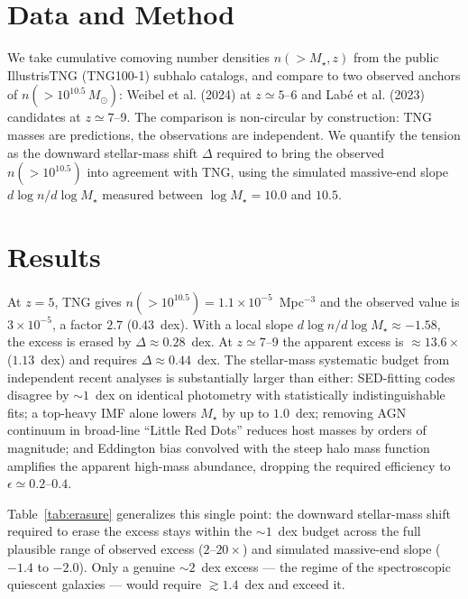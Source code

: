\documentclass[twocolumn]{aastex631}
\begin{document}
\section{Data and Method}
We take cumulative comoving number densities $n(>M_\star,z)$ from the public IllustrisTNG (TNG100-1)
subhalo catalogs, and compare to two observed anchors of $n(>10^{10.5}\,M_\odot)$: Weibel et al. (2024)
at $z\simeq5$--6 and Lab{\'e} et al. (2023) candidates at $z\simeq7$--9. The comparison is non-circular
by construction: TNG masses are predictions, the observations are independent. We quantify the tension as
the downward stellar-mass shift $\Delta$ required to bring the observed $n(>10^{10.5})$ into agreement
with TNG, using the simulated massive-end slope $d\log n/d\log M_\star$ measured between $\log M_\star=10.0$
and $10.5$.

\section{Results}
At $z=5$, TNG gives $n(>10^{10.5})=1.1\times10^{-5}$~Mpc$^{-3}$ and the observed value is
$3\times10^{-5}$, a factor $2.7$ ($0.43$~dex). With a local slope $d\log n/d\log M_\star\approx-1.58$,
the excess is erased by $\Delta\approx0.28$~dex. At $z\simeq7$--9 the apparent excess is $\approx13.6\times$
($1.13$~dex) and requires $\Delta\approx0.44$~dex. The stellar-mass systematic budget from independent
recent analyses is substantially larger than either: SED-fitting codes disagree by $\sim1$~dex on identical
photometry with statistically indistinguishable fits; a top-heavy IMF alone lowers $M_\star$ by up to
$1.0$~dex; removing AGN continuum in broad-line ``Little Red Dots'' reduces host masses by orders of
magnitude; and Eddington bias convolved with the steep halo mass function amplifies the apparent
high-mass abundance, dropping the required efficiency to $\epsilon\simeq0.2$--$0.4$.


Table~\ref{tab:erasure} generalizes this single point: the downward stellar-mass shift required to erase
the excess stays within the $\sim1$~dex budget across the full plausible range of observed excess
($2$--$20\times$) and simulated massive-end slope ($-1.4$ to $-2.0$). Only a genuine $\sim2$~dex excess
--- the regime of the spectroscopic quiescent galaxies --- would require $\gtrsim1.4$~dex and exceed it.
\end{document}
